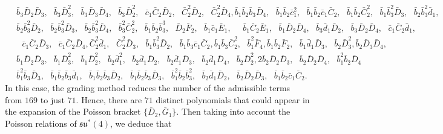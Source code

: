 \documentclass[10pt]{amsart}
\theoremstyle{definition}
\theoremstyle{corollary}
\theoremstyle{remark}
\theoremstyle{conclusion}
\begin{document}
\begin{align*}
    &\, \bar{b}_3 \bar{D}_2 \bar{D}_3,\text{ }\bar{b}_3 \bar{D}_3^2,\text{ }\bar{b}_3 \bar{D}_3 \bar{D}_4,\text{ }\bar{b}_3 \bar{D}_2^2,\text{ }\bar{c}_1 \bar{C}_2 \bar{D}_2,\text{ }\bar{C}_2^2 \bar{D}_2,\text{ }\bar{C}_2^2 \bar{D}_4,\bar{b}_1 \bar{b}_2 \bar{b}_3 \bar{D}_4,\text{ }\bar{b}_1 \bar{b}_2 \bar{c}_1^2,\text{ } \bar{b}_1 \bar{b}_2 \bar{c}_1 \bar{C}_2,\text{ }\bar{b}_1 \bar{b}_2 \bar{C}_2^2,\text{ }\bar{b}_1 \bar{b}_3^2 \bar{D}_3,\text{ }\bar{b}_2 \bar{b}_3^2 \bar{d}_1,\\
    &\, \bar{b}_2 \bar{b}_3^2 \bar{D}_2,\text{ }\bar{b}_2 \bar{b}_3^2 \bar{D}_3,\text{ }\bar{b}_2 \bar{b}_3^2 \bar{D}_4,\text{ }\bar{b}_3^2 \bar{C}_2^2,\text{ }\bar{b}_1 \bar{b}_2 \bar{b}_3^3,\text{ }\bar{D}_2 \bar{F}_2,\text{ }\bar{b}_1 \bar{c}_1 \bar{E}_1,\text{ }\text{ }\bar{b}_1 \bar{C}_2 \bar{E}_1,\text{ }\bar{b}_1 \bar{D}_2 \bar{D}_4, \text{ }\bar{b}_3 \bar{d}_1 \bar{D}_2,\text{ }\bar{b}_3 \bar{D}_2 \bar{D}_4,\text{ }\bar{c}_1 \bar{C}_2 \bar{d}_1,\\
    &\,\text{ }\bar{c}_1 \bar{C}_2 \bar{D}_3,\text{ }\bar{c}_1 \bar{C}_2 \bar{D}_4,\bar{C}_2^2 \bar{d}_1,\text{ }\bar{C}_2^2 \bar{D}_3,\text{ }\bar{b}_1 \bar{b}_3^2 \bar{D}_2, \text{ } \bar{b}_1 \bar{b}_3 \bar{c}_1 \bar{C}_2,\bar{b}_1 \bar{b}_3 \bar{C}_2^2,\text{ }\bar{b}_1^2 \bar{F}_4,\bar{b}_1 \bar{b}_2 \bar{F}_2,\text{ }\bar{b}_1 \bar{d}_1 \bar{D}_3,\text{ }\bar{b}_2 \bar{D}_3^2,\bar{b}_2 \bar{D}_3 \bar{D}_4,\\
    &\, \bar{b}_1 \bar{D}_2 \bar{D}_3,\text{ }\bar{b}_1 \bar{D}_3^2,\text{ }\bar{b}_1 \bar{D}_2^2,\text{ }\bar{b}_2 \bar{d}_1^2,\text{ } \bar{b}_2 \bar{d}_1 \bar{D}_2,\text{ } \bar{b}_2 \bar{d}_1 \bar{D}_3, \text{ }  \bar{b}_2 \bar{d}_1 \bar{D}_4,\text{ }\bar{b}_2 \bar{D}_2^2,2 \bar{b}_2 \bar{D}_2 \bar{D}_3,\text{ } \bar{b}_2 \bar{D}_2 \bar{D}_4,\text{ }\bar{b}_1^2 \bar{b}_2 \bar{D}_4 \\
    &\,\bar{b}_1^2 \bar{b}_3 \bar{D}_3,\text{ }\bar{b}_1 \bar{b}_2 \bar{b}_3 \bar{d}_1,\text{ }\bar{b}_1 \bar{b}_2 \bar{b}_3 \bar{D}_2,\text{ }\bar{b}_1 \bar{b}_2 \bar{b}_3 \bar{D}_3,\text{ }\bar{b}_1^2 \bar{b}_2 \bar{b}_3^2,\text{ }\bar{b}_2 \bar{d}_1 \bar{D}_2,\text{ }\bar{b}_2 \bar{D}_2 \bar{D}_3,\text{ }\bar{b}_1 \bar{b}_2 \bar{c}_1 \bar{C}_2.
\end{align*} 
In this case, the grading method reduces the number of the admissible terms from $169$ to just $71$. Hence, there are $71$ distinct polynomials that could appear in the expansion of the Poisson bracket $\{\bar{D}_2,\bar{G}_1\}$. Then taking into  account the Poisson relations of $\mathfrak{su}^*(4)$, we deduce that 
\end{document}
